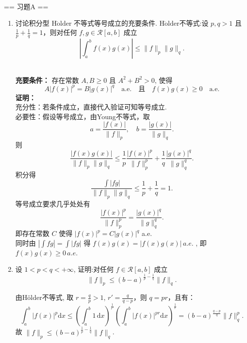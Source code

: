 \newenvironment{solution}{\begin{proofc}[解答]}{\end{proofc}}

== 习题A ==

\begin{enumerate}
    \item[1.]讨论积分型 $\mathrm{H\ddot{o}lder}$ 不等式等号成立的充要条件. 
    $\mathrm{H\ddot{o}lder}$不等式:设 \(p,q > 1\) 且 \(\displaystyle \frac{1}{p} +\frac{1}{q} = 1\)，则对任何 \(\displaystyle f,g\in \mathcal{R}[a,b]\) 成立
    \[\displaystyle \left|\int_{a}^{b}f(x)g(x)\right|\leq \lVert f\rVert_{p}\lVert g\rVert_{q}.\]
    \begin{solution}\\
        \textbf{充要条件：} 存在常数 $A, B \geq 0$ 且 $A^2 + B^2 > 0$, 使得 \[ A|f(x)|^p = B|g(x)|^q \quad \text{a.e.} \quad \text{且}\quad  f(x)g(x) \geq 0 \quad  \text{a.e.}\]
        \textbf{证明：} \\
        充分性：若条件成立，直接代入验证可知等号成立.\\
        必要性：假设等号成立，由Young不等式，取 
        \[ a = \frac{|f(x)|}{\|f\|_p}, \quad b = \frac{|g(x)|}{\|g\|_q}. \]
        则 
        \[ \frac{|f(x)g(x)|}{\|f\|_p\|g\|_q} \leq \frac{1}{p}\frac{|f(x)|^p}{\|f\|_p^p} + \frac{1}{q}\frac{|g(x)|^q}{\|g\|_q^q}.\]
        积分得 
        \[ \frac{\displaystyle \int |fg|}{\|f\|_p\|g\|_q} \leq \frac{1}{p} + \frac{1}{q} = 1.\]
        等号成立要求几乎处处有 
        \[ \frac{|f(x)|^p}{\|f\|_p^p} = \frac{|g(x)|^q}{\|g\|_q^q}.\]
        即存在常数 $C$ 使得 $|f(x)|^p = C|g(x)|^q$ a.e. \\
        同时由 $\displaystyle \left|\int fg\right| = \int |fg|$ 得 $f(x)g(x) = |f(x)g(x)|\, a.e.$ , 即 $f(x)g(x) \geq 0\, a.e$. 
    \end{solution}
    
    \item[2.]设 \(\displaystyle 1< p< q< +\infty\), 证明:对任何 \(f\in \mathcal{R}[a,b]\) 成立
    \[\displaystyle \lVert f\rVert_{p}\leq (b - a)^{\frac{1}{p} -\frac{1}{q}}\lVert f\rVert_{q}.\]
    \begin{solution}
        由Hölder不等式, 取 $\displaystyle r = \frac{q}{p} > 1$, $\displaystyle r' = \frac{q}{q-p}$，则 $q=pr$，且有：
        \[ \int_a^b |f(x)|^p \mathrm{d}x \leq \left(\int_a^b 1\,\mathrm{d}x\right)^{\frac{1}{r'}} \left( \int_a^b |f(x)|^{pr} \mathrm{d}x \right)^{\frac{1}{r}} = (b-a)^{\frac{q-p}{q}} \|f\|_q^p. \]
        故 $\displaystyle \|f\|_p \leq (b-a)^{\frac{1}{p} - \frac{1}{q}} \|f\|_q$.
    \end{solution}
    

\end{enumerate}
